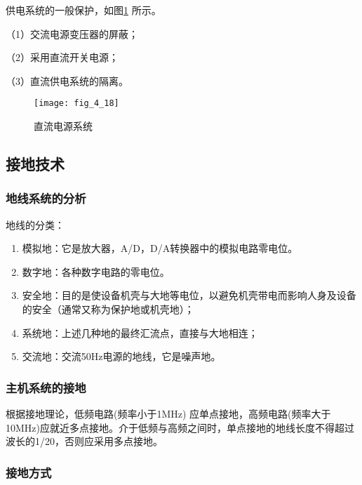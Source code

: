 供电系统的一般保护，如图\ref{fig_4_18} 所示。

（1）交流电源变压器的屏蔽；

（2）采用直流开关电源；

（3）直流供电系统的隔离。

\begin{figure}[h]
  \centering
  \texttt{[image: fig\_4\_18]}\\
  \caption{直流电源系统}\label{fig_4_18}
\end{figure}



\subsection{接地技术}


\subsubsection{地线系统的分析}

  地线的分类：
\begin{enumerate}
\item 模拟地：它是放大器，A/D，D/A转换器中的模拟电路零电位。
\item 数字地：各种数字电路的零电位。
\item 安全地：目的是使设备机壳与大地等电位，以避免机壳带电而影响人身及设备的安全（通常又称为保护地或机壳地）；
\item 系统地：上述几种地的最终汇流点，直接与大地相连；
\item 交流地：交流50Hz电源的地线，它是噪声地。
\end{enumerate}


\subsubsection{主机系统的接地}

根据接地理论，低频电路(频率小于1MHz) 应单点接地，高频电路(频率大于10MHz)应就近多点接地。介于低频与高频之间时，单点接地的地线长度不得超过波长的1/20，否则应采用多点接地。


\subsubsection{接地方式}

